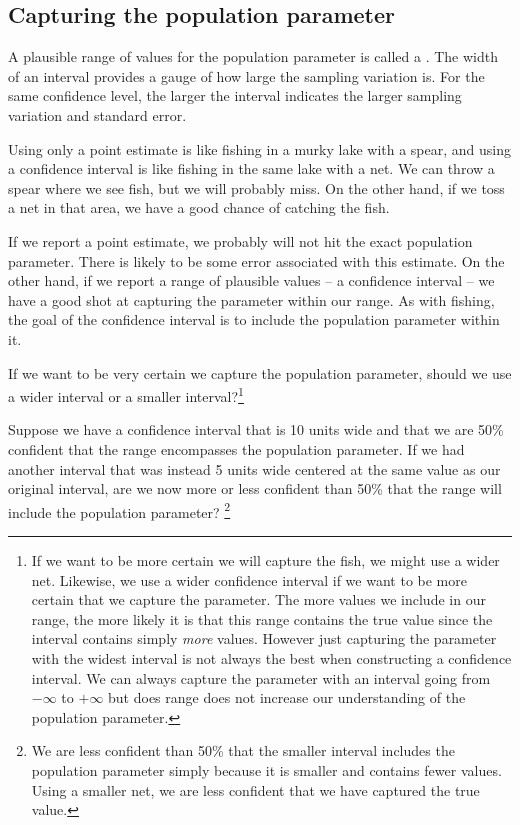 \subsection{Capturing the population parameter}

A plausible range of values for the population parameter is called a . The width of an interval provides a gauge of how large the sampling variation is. For the same confidence level, the larger the interval indicates the larger sampling variation and standard error.

Using only a point estimate is like fishing in a murky lake with a spear, and using a confidence interval is like fishing in the same lake with a net. We can throw a spear where we see fish, but we will probably miss. On the other hand, if we toss a net in that area, we have a good chance of catching the fish.

If we report a point estimate, we probably will not hit the exact population parameter. There is likely to be some error associated with this estimate. On the other hand, if we report a range of plausible values -- a confidence interval -- we have a good shot at capturing the parameter within our range. As with fishing, the goal of the confidence interval is to include the population parameter within it. 

\begin{exercise}
If we want to be very certain we capture the population parameter, should we use a wider interval or a smaller interval?\footnote{If we want to be more certain we will capture the fish, we might use a wider net. Likewise, we use a wider confidence interval if we want to be more certain that we capture the parameter. The more values we include in our range, the more likely it is that this range contains the true value since the interval contains simply \emph{more} values. However just capturing the parameter with the widest interval is not always the best when constructing a confidence interval. We can always capture the parameter with an interval going from $-\infty$ to $+\infty$ but does range does not increase our understanding of the population parameter.}
\end{exercise}
\begin{exercise}
Suppose we have a confidence interval that is 10 units wide and that we are 50\% confident that the range encompasses the population parameter. If we had another interval that was instead 5 units wide centered at the same value as our original interval, are we now more or less confident than 50\% that the range will include the population parameter? \footnote{We are less confident than 50\% that the smaller interval includes the population parameter simply because it is smaller and contains fewer values. Using a smaller net, we are less confident that we have captured the true value.}
\end{exercise}

